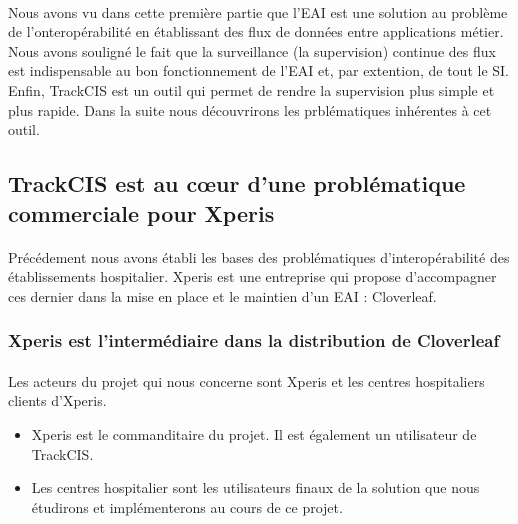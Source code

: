 			\paragraph{}%
			
			
			\paragraph{}%
			
		
		\paragraph{}%
		Nous avons vu dans cette première partie que l'EAI est une solution au
		problème de l'onteropérabilité en établissant des flux de données entre
		applications métier. Nous avons souligné le fait que la surveillance (la
		supervision) continue des flux est indispensable au bon fonctionnement de
		l'EAI et, par extention, de tout le SI. Enfin, TrackCIS est un outil qui
		permet de rendre la supervision plus simple et plus rapide.\newline
		Dans la suite nous découvrirons les prblématiques inhérentes à cet outil.
		
	\subsection{TrackCIS est au cœur d'une problématique commerciale pour Xperis}
		\paragraph{}
		Précédement nous avons établi les bases des problématiques d'interopérabilité
		des établissements hospitalier. Xperis est une entreprise qui propose
		d'accompagner ces dernier dans la mise en place et le maintien d'un EAI :
		Cloverleaf.
		
		\subsubsection{Xperis est l'intermédiaire dans la distribution de Cloverleaf}
			\paragraph{}%
			Les acteurs du projet qui nous concerne sont Xperis et les centres
			hospitaliers clients d'Xperis.
			\begin{itemize}
			  \item Xperis est le commanditaire du projet. Il est également un
			  utilisateur de TrackCIS.
			  \item Les centres hospitalier sont les utilisateurs finaux de la solution
			  que nous étudirons et implémenterons au cours de ce projet.
			\end{itemize}
			
